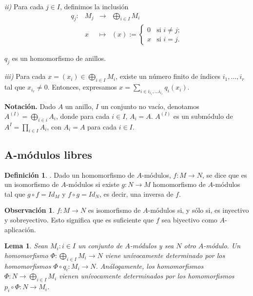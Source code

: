\documentclass[a4paper,12pt]{article}
\newtheorem{lemma}[theorem]{Lema}
\theoremstyle{definition}
\newtheorem{definition}[theorem]{Definición}
\newtheorem{remark}[theorem]{Observación}
\begin{document}
\textit{ii)} Para cada $j\in I$, definimos la inclusión 
$$\begin{array}{rrcl}
q_j:&M_j&\longrightarrow&\bigoplus_{i\in I}M_i\\
&x&\longmapsto&  (x) := \left\{ \begin{array}{ll}
         0 & \mbox{si $i\neq j$};\\
         x & \mbox{si $i=j$}.\end{array} \right.  
\end{array}$$

$q_j$ es un homomorfismo de anillos.

\textit{iii)} Para cada $x=(x_i)\in \bigoplus_{i\in I}M_i$, existe un número finito de índices $i_1,...,i_r$ tal que $x_{i_r}\neq 0$. Entonces, expresamos $x=\sum_{i\in {i_{i_1},...i_{i_r}}} q_i(x_i)$.

\textbf{Notación.} Dado $A$ un anillo, $I$ un conjunto no vacío, denotamos $A^{(I)}=\bigoplus_{i\in i} A_i$, donde para cada $i\in I$, $A_i=A$. $A^{(I)}$ es un submódulo de $A^{I} = \prod_{i\in I} A_i$, con $A_i=A$ para cada $i\in I$.

\subsection{A-módulos libres}

\begin{definition}. Dado un homomorfismo de $A$-módulos, $f:M\rightarrow N$, se dice que es un isomorfismo de $A$-módulos si existe $g:N\rightarrow M$ homomorfismo de $A$-módulos tal que $g\circ f = Id_M$ y $f\circ g = Id_N$, es decir, una inversa de $f$.
\end{definition}

\begin{remark} $f:M\longrightarrow N$ es isomorfismo de $A$-módulos si, y sólo si, es inyectivo y sobreyectivo. Esto significa que es suficiente que $f$ sea biyectivo como $A$-aplicación.
\end{remark}

\begin{lemma} Sean ${M_i:i\in I}$ un conjunto de $A$-módulos y sea $N$ otro $A$-módulo. Un homomorfismo $\Phi:\bigoplus_{i\in I} M_i \rightarrow N$ viene unívocamente determinado por los homomorfismos $\Phi \circ q_i:M_i \rightarrow N$. Análogamente, los homomorfismos $\Phi:N\rightarrow \bigoplus_{i\in I} M_i$ vienen unívocamente determinados por los homomorfismos $p_i\circ \Phi:N\rightarrow M_i$.
\end{lemma}
\end{document}
